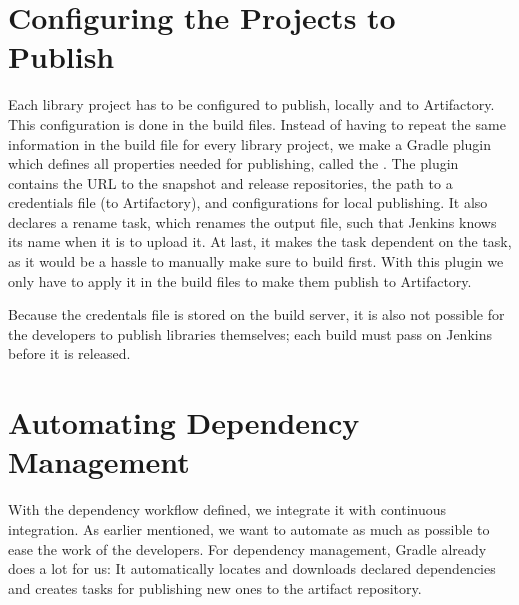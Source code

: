 \section{Configuring the Projects to Publish}\label{sec:conf_project_to_publish}
Each library project has to be configured to publish, locally and to Artifactory. This configuration is done in the build files. Instead of having to repeat the same information in the build file for every library project, we make a Gradle plugin which defines all properties needed for publishing, called the . The plugin contains the URL to the snapshot and release repositories, the path to a credentials file (to Artifactory), and configurations for local publishing. It also declares a rename task, which renames the output file, such that Jenkins knows its name when it is to upload it. At last, it makes the  task dependent on the  task, as it would be a hassle to manually make sure to build first. With this plugin we only have to apply it in the build files to make them publish to Artifactory.

Because the credentals file is stored on the build server, it is also not possible for the developers to publish libraries themselves; each build must pass on Jenkins before it is released.

\section{Automating Dependency Management}\label{sec:automating_vm}
With the dependency workflow defined, we integrate it with continuous integration. As earlier mentioned, we want to automate as much as possible to ease the work of the developers. For dependency management, Gradle already does a lot for us: It automatically locates and downloads declared dependencies and creates tasks for publishing new ones to the artifact repository.


